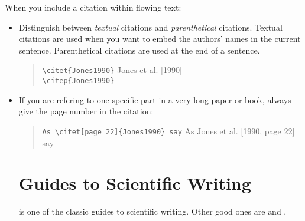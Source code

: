 When you include a citation within flowing text:
\begin{itemize}
\item Distinguish between \emph{textual} citations and
  \emph{parenthetical} citations. Textual citations are used when you
  want to embed the authors' names in the current sentence.
  Parenthetical citations are used at the end of a sentence.
\begin{quote}
\verb|\citet{Jones1990}| \rightarrowsym Jones et al. [1990] \\
\verb|\citep{Jones1990}| \rightarrowsym [Jones et al., 1990]
\end{quote}


\item If you are refering to one specific part in a very long paper
  or book, always give the page number in the citation:
\begin{quote}
\verb|As \citet[page 22]{Jones1990} say| \rightarrowsym As Jones et al. [1990, page 22] say\\
\end{quote}




\section{Guides to Scientific Writing}

\citet{CraftScientificWriting} is one of the classic guides to
scientific writing. Other good ones are \citet{BoothCraft}
and \citet{BoothCommunicating}.



\end{itemize}

